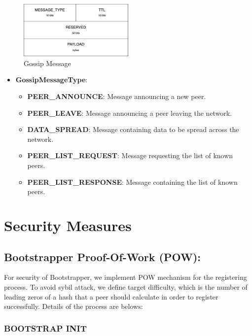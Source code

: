 \begin{figure}[H]
    \centering
    \includegraphics[width=0.5\textwidth]{pics/gossip.message.png}
    \caption{Gossip Message}
\end{figure}

\begin{itemize}
    \item \textbf{GossipMessageType}:
      
        \begin{itemize}
            \item \textbf{PEER\_ANNOUNCE}: Message announcing a new peer.
            \item \textbf{PEER\_LEAVE}: Message announcing a peer leaving the network.
            \item \textbf{DATA\_SPREAD}: Message containing data to be spread across the network.
            \item \textbf{PEER\_LIST\_REQUEST}: Message requesting the list of known peers.
            \item \textbf{PEER\_LIST\_RESPONSE}: Message containing the list of known peers.
        \end{itemize}
\end{itemize}

\section{Security Measures}

\subsection{Bootstrapper Proof-Of-Work (POW):}

For security of Bootstrapper, we implement POW mechanism for the registering process. To avoid sybil attack, we define target difficulty, which is the number of leading zeros of a hash that a peer should calculate in order to register successfully. Details of the process are belows:

\subsubsection{BOOTSTRAP INIT}

